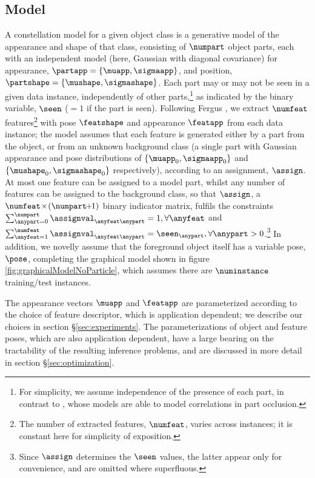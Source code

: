 \subsection{Model}
\label{sec:model}
A constellation model for a given object class is a generative model of the appearance and shape of that class, consisting of $\numpart$ object parts, each with an independent model (here, Gaussian with diagonal covariance) for appearance, $\partapp=\{\muapp,\sigmaapp\}$, and position, $\partshape=\{\mushape,\sigmashape\}$. Each part may or may not be seen in a given data instance, independently of other parts,\!\!\footnote{For simplicity, we assume independence of the presence of each part, in contrast to \cite{Fergus2007,Weber2000}, whose models are able to model correlations in part occlusion.} as indicated by the binary variable, $\seen$ ($=1$ if the part is seen). Following Fergus \etal \cite{Fergus2007}, we extract $\numfeat$ features\footnote{The number of extracted features, $\numfeat$, varies across instances; it is constant here for simplicity of exposition.} with pose $\featshape$ and appearance $\featapp$ from each data instance; the model assumes that each feature is generated either by a part from the object, or from an unknown background class (a single part with Gaussian appearance and pose distributions of $\{\muapp_0,\sigmaapp_0\}$ and $\{\mushape_0,\sigmashape_0\}$ respectively), according to an assignment, $\assign$. At most one feature can be assigned to a model part, whilst any number of features can be assigned to the background class, so that $\assign$, a $\numfeat\!\times\!(\numpart\!\!+\!\!1)$ binary indicator matrix, fulfils the constraints $\sum_{\anypart = 0}^{\numpart}\assignval_{\anyfeat\anypart}=1,\forall \anyfeat$ and $\sum_{\anyfeat = 1}^{\numfeat}\assignval_{\anyfeat\anypart}=\seen_\anypart,\forall \anypart>0$.\!\!\footnote{Since $\assign$ determines the $\seen$ values, the latter appear only for convenience, and are omitted where superfluous.} In addition, we novelly assume that the foreground object itself has a variable pose, $\pose$, completing the graphical model shown in figure \ref{fig:graphicalModelNoParticle}, which assumes there are $\numinstance$ training/test instances.

The appearance vectors $\muapp$ and $\featapp$ are parameterized according to the choice of feature descriptor, which is application dependent; we describe our choices in section \S\ref{sec:experiments}. The parameterizations of object and feature poses, which are also application dependent, have a large bearing on the tractability of the resulting inference problems, and are discussed in more detail in section \S\ref{sec:optimization}.

